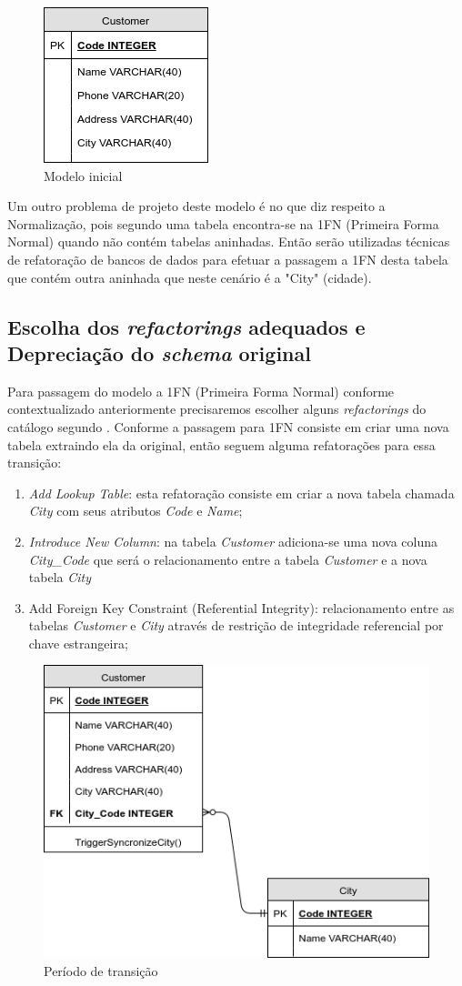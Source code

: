 \documentclass[10pt]{article}
\begin{document}
	\begin{figure}[ht]
		\centering
		\includegraphics[width=.2\textwidth]{img/databaseRefactoring-initialModel.png}
		\caption{Modelo inicial}
		\label{figura:5}
	\end{figure}

    Um outro problema de projeto deste modelo é no que diz respeito a Normalização, pois segundo \cite{Heuser:ProjetoBD} uma tabela encontra-se na 1FN (Primeira Forma Normal) quando não contém tabelas aninhadas. Então serão utilizadas técnicas de refatoração de bancos de dados para efetuar a passagem a 1FN desta tabela que contém outra aninhada que neste cenário é a "City" (cidade).


\subsection{Escolha dos \textit{refactorings} adequados e Depreciação do \textit{schema} original}
    Para passagem do modelo a 1FN (Primeira Forma Normal) conforme contextualizado anteriormente precisaremos escolher alguns \textit{refactorings} do catálogo segundo \cite{Ambler:RefactoringDatabases}. Conforme \cite{Heuser:ProjetoBD} a passagem para 1FN consiste em criar uma nova tabela extraindo ela da original, então seguem alguma refatorações para essa transição:
    
    \begin{enumerate}
        \item \textit{Add Lookup Table}: esta refatoração consiste em criar a nova tabela chamada \textit{City} com seus atributos \textit{Code} e \textit{Name};
        \item \textit{Introduce New Column}: na tabela \textit{Customer} adiciona-se uma nova coluna \textit{City\_Code} que será o relacionamento entre a tabela \textit{Customer} e a nova tabela \textit{City}
        \item Add Foreign Key Constraint (Referential Integrity): relacionamento entre as tabelas \textit{Customer} e \textit{City} através de restrição de integridade referencial por chave estrangeira;
    \end{enumerate}

	\begin{figure}[ht]
		\centering
		\includegraphics[width=.45\textwidth]{img/databaseRefactoring-transitionPeriod.png}
		\caption{Período de transição}
		\label{figura:6}
	\end{figure}
\end{document}
